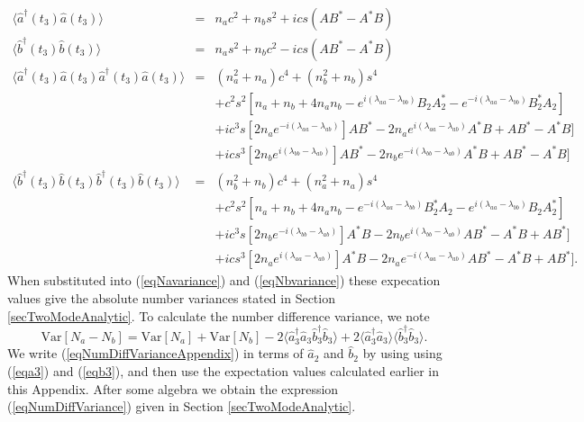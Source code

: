 \documentclass{iopart}
\begin{document}
\begin{eqnarray}
\langle \hat{a}^{\dagger}(t_3) \hat{a}(t_3) \rangle &=& n_a c^2 + n_b s^2 + i c s (A B^* - A^* B) \\
%
\langle \hat{b}^{\dagger}(t_3) \hat{b}(t_3) \rangle &=& n_a s^2 + n_b c^2 - i c s (A B^* - A^* B) \\
%
\langle \hat{a}^{\dagger}(t_3) \hat{a}(t_3) \hat{a}^{\dagger}(t_3)  \hat{a}(t_3) \rangle &=& (n_a^2 + n_a) c^4 + (n_b^2 + n_b) s^4 \nonumber \\
&& + c^2 s^2 [n_a +n_b +4 n_a n_b - e^{i(\lambda_{aa}-\lambda_{bb})} B_2 A_2^* - e^{-i(\lambda_{aa}-\lambda_{bb})} B_2^* A_2] \nonumber \\
&& + i c^3 s [2 n_a e^{-i(\lambda_{aa}-\lambda_{ab})}] A B^* - 2 n_a e^{i(\lambda_{aa}-\lambda_{ab})} A^* B + A B^* - A^* B] \nonumber \\
&& + i c s^3 [2 n_b e^{i(\lambda_{bb}-\lambda_{ab})}] A B^* - 2 n_b e^{-i(\lambda_{bb}-\lambda_{ab})} A^* B + A B^* - A^* B] \\
%
\langle \hat{b}^{\dagger}(t_3)  \hat{b}(t_3) \hat{b}^{\dagger}(t_3)  \hat{b}(t_3) \rangle &=& (n_b^2 + n_b) c^4 + (n_a^2 + n_a) s^4 \nonumber \\
&& + c^2 s^2 [n_a +n_b +4 n_a n_b - e^{-i(\lambda_{aa}-\lambda_{bb})} B_2^* A_2 - e^{i(\lambda_{aa}-\lambda_{bb})} B_2 A_2^*] \nonumber \\
&& + i c^3 s [2 n_b e^{-i(\lambda_{bb}-\lambda_{ab})}] A^* B - 2 n_b e^{i(\lambda_{bb}-\lambda_{ab})} A B^* - A^* B + A B^*] \nonumber \\
&& + i c s^3 [2 n_a e^{i(\lambda_{aa}-\lambda_{ab})}] A^* B - 2 n_a e^{-i(\lambda_{aa}-\lambda_{ab})} A B^* - A^* B + A B^*]. 
\end{eqnarray}
When substituted into (\ref{eqNavariance}) and (\ref{eqNbvariance}) these expecation values give the absolute number variances stated in Section \ref{secTwoModeAnalytic}. To calculate the number difference variance, we note
\begin{equation}
{\mathrm{Var}}[N_a-N_b] = {\mathrm{Var}}[N_a] + {\mathrm{Var}}[N_b] - 2\langle \hat{a}^{\dagger}_3 \hat{a}_3 \hat{b}^{\dagger}_3 \hat{b}_3\rangle + 2\langle \hat{a}^{\dagger}_3  \hat{a}_3 \rangle \langle \hat{b}^{\dagger}_3 \hat{b}_3\rangle \label{eqNumDiffVarianceAppendix}.
\end{equation}
We write (\ref{eqNumDiffVarianceAppendix}) in terms of $\hat{a}_2$ and $\hat{b}_2$ by using using (\ref{eqa3}) and (\ref{eqb3}), and then use the expectation values calculated earlier in this Appendix. After some algebra we obtain the expression (\ref{eqNumDiffVariance}) given in Section \ref{secTwoModeAnalytic}.
\end{document}
